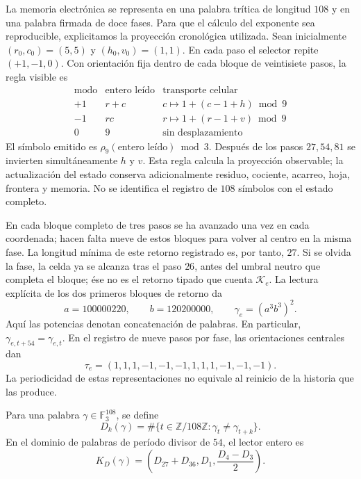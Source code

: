 La memoria electrónica se representa en una palabra trítica de longitud
\(108\) y en una palabra firmada de doce fases. Para que el cálculo del
exponente sea reproducible, explicitamos la proyección cronológica
utilizada. Sean inicialmente
\((r_0,c_0)=(5,5)\) y \((h_0,v_0)=(1,1)\). En cada paso el selector
repite \((+1,-1,0)\). Con orientación fija dentro de cada bloque de
veintisiete pasos, la regla visible es
\[
 \begin{array}{c|c|c}
 \text{modo}&\text{entero leído}&\text{transporte celular}\\\hline
 +1&r+c&c\mapsto1+(c-1+h)\bmod9\\
 -1&rc&r\mapsto1+(r-1+v)\bmod9\\
 0&9&\text{sin desplazamiento}
 \end{array}
\]
El símbolo emitido es \(\rho_9(\text{entero leído})\bmod3\).
Después de los pasos \(27,54,81\) se invierten simultáneamente
\(h\) y \(v\). Esta regla calcula la proyección observable; la
actualización del estado conserva adicionalmente residuo, cociente,
acarreo, hoja, frontera y memoria. No se identifica el registro de
\(108\) símbolos con el estado completo.

En cada bloque completo de tres pasos se ha avanzado una vez en cada
coordenada; hacen falta nueve de estos bloques para volver al centro en
la misma fase. La longitud mínima de este retorno registrado es, por
tanto, \(27\). Si se olvida la fase, la celda ya se alcanza tras el
paso \(26\), antes del umbral neutro que completa el bloque; ése no es
el retorno tipado que cuenta \(\mathcal K_e\). La lectura explícita
de los dos primeros bloques de retorno da
\begin{equation}
 a=100000220,\qquad b=120200000,\qquad
 \gamma_e=(a^3b^3)^2.
 \label{eq:el-palabra}
\end{equation}
Aquí las potencias denotan concatenación de palabras. En particular,
\(\gamma_{e,t+54}=\gamma_{e,t}\). En el registro de nueve pasos por
fase, las orientaciones centrales dan
\begin{equation}
 \tau_e=(1,1,1,-1,-1,-1,1,1,1,-1,-1,-1).
 \label{eq:el-tau}
\end{equation}
La periodicidad de estas representaciones no equivale al reinicio de la
historia que las produce.



\begin{definition}
Para una palabra \(\gamma\in\mathbb F_3^{108}\), se define
\[
 D_k(\gamma)=\#\{t\in\mathbb Z/108\mathbb Z:
                   \gamma_t\ne\gamma_{t+k}\}.
\]
En el dominio de palabras de período divisor de \(54\), el lector
entero es
\begin{equation}
 K_D(\gamma)=\left(D_{27}+D_{36},D_1,\frac{D_4-D_3}{2}\right).
 \label{eq:el-kd}
\end{equation}
\end{definition}

